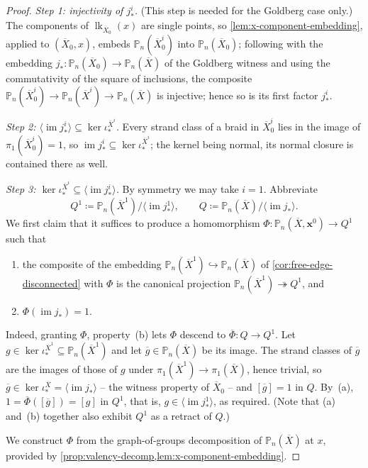\documentclass[reqno]{amsart}
\theoremstyle{definition}
\newcommand\bfx{\mathbf{x}}
\newcommand{\PB}{\mathbb{P}}
\newcommand{\im}{\operatorname{im}}
\newcommand{\co}[1]{\mathopen{\langle}#1\mathclose{\rangle}} %
\newcommand{\base}{\bfx^0}
\renewcommand{\bar}{\overline}
\DeclareMathOperator{\lk}{lk}
\numberwithin{equation}{section}
\begin{document}
\begin{proof}
\emph{Step 1: injectivity of \(j^i_\ast\).} (This step is needed
for the Goldberg case only.) The components of
\(\lk_{\bar X_0}(x)\) are single points, so
\cref{lem:x-component-embedding}, applied to \((\bar X_0,x)\),
embeds \(\PB_n(\bar X_0^i)\) into \(\PB_n(\bar X_0)\); following
with the embedding \(j_\ast\colon\PB_n(\bar X_0)\to\PB_n(\bar X)\)
of the Goldberg witness and using the commutativity of the square
of inclusions, the composite
\(\PB_n(\bar X_0^i)\to\PB_n(\bar X^i)\to\PB_n(\bar X)\) is
injective; hence so is its first factor \(j^i_\ast\).

\emph{Step 2: \(\co{\im j^i_\ast}\subseteq\ker\iota^{\bar X^i}_\ast\).}
Every strand class of a braid in \(\bar X_0^i\) lies in the image
of \(\pi_1(\bar X_0^i)=1\), so
\(\im j^i_\ast\subseteq\ker\iota^{\bar X^i}_\ast\); the kernel
being normal, its normal closure is contained there as well.

\emph{Step 3: \(\ker\iota^{\bar X^i}_\ast\subseteq\co{\im j^i_\ast}\).}
By symmetry we may take \(i=1\). Abbreviate
\[
Q^1\coloneqq\PB_n(\bar X^1)\big/\co{\im j^1_\ast},
\qquad
Q\coloneqq\PB_n(\bar X)\big/\co{\im j_\ast}.
\]
We first claim that it suffices to produce a homomorphism
\(\Phi\colon\PB_n(\bar X,\base)\to Q^1\) such that
\begin{enumerate}[label=(\alph*), leftmargin=2em]
    \item the composite of the embedding
          \(\PB_n(\bar X^1)\hookrightarrow\PB_n(\bar X)\) of
          \cref{cor:free-edge-disconnected} with \(\Phi\) is the
          canonical projection
          \(\PB_n(\bar X^1)\twoheadrightarrow Q^1\), and
    \item \(\Phi(\im j_\ast)=1\).
\end{enumerate}
Indeed, granting \(\Phi\), property~(b) lets \(\Phi\) descend to
\(\bar\Phi\colon Q\to Q^1\). Let
\(g\in\ker\iota^{\bar X^1}_\ast\subseteq\PB_n(\bar X^1)\) and let
\(\bar g\in\PB_n(\bar X)\) be its image. The strand classes of
\(\bar g\) are the images of those of \(g\) under
\(\pi_1(\bar X^1)\to\pi_1(\bar X)\), hence trivial, so
\(\bar g\in\ker\iota^{\bar X}_\ast=\co{\im j_\ast}\) -- the
witness property of \(\bar X_0\) -- and \([\bar g]=1\) in \(Q\).
By~(a), \(1=\bar\Phi([\bar g])=[g]\) in \(Q^1\), that is,
\(g\in\co{\im j^1_\ast}\), as required. (Note that (a) and~(b)
together also exhibit \(Q^1\) as a retract of \(Q\).)

We construct \(\Phi\) from the graph-of-groups decomposition
of \(\PB_n(\bar X)\) at \(x\), provided by
\cref{prop:valency-decomp,lem:x-component-embedding}.


\end{proof}
\end{document}
